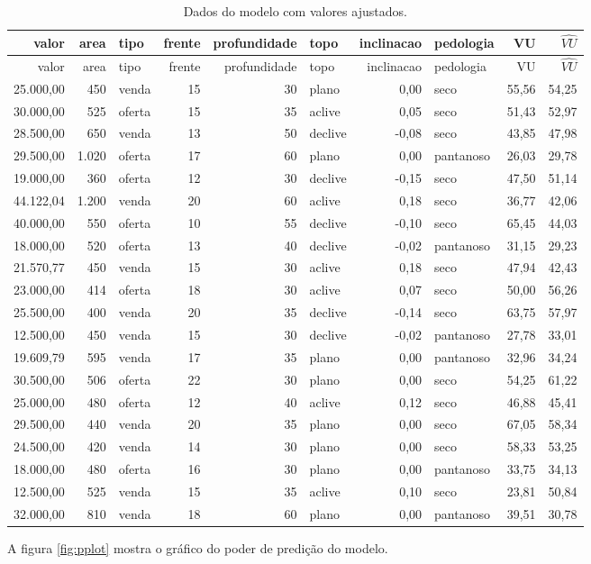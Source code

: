 \documentclass[a4paper, 12pt]{article}
\begin{document}
\begin{longtable}[]{@{}rrlrrlrlrr@{}}
\caption{Dados do modelo com valores ajustados.}\tabularnewline
\toprule
valor & area & tipo & frente & profundidade & topo & inclinacao &
pedologia & VU & \(\widehat{VU}\)\tabularnewline
\midrule
\endfirsthead
\toprule
valor & area & tipo & frente & profundidade & topo & inclinacao &
pedologia & VU & \(\widehat{VU}\)\tabularnewline
\midrule
\endhead
25.000,00 & 450 & venda & 15 & 30 & plano & 0,00 & seco & 55,56 &
54,25\tabularnewline
30.000,00 & 525 & oferta & 15 & 35 & aclive & 0,05 & seco & 51,43 &
52,97\tabularnewline
28.500,00 & 650 & venda & 13 & 50 & declive & -0,08 & seco & 43,85 &
47,98\tabularnewline
29.500,00 & 1.020 & oferta & 17 & 60 & plano & 0,00 & pantanoso & 26,03
& 29,78\tabularnewline
19.000,00 & 360 & oferta & 12 & 30 & declive & -0,15 & seco & 47,50 &
51,14\tabularnewline
44.122,04 & 1.200 & venda & 20 & 60 & aclive & 0,18 & seco & 36,77 &
42,06\tabularnewline
40.000,00 & 550 & oferta & 10 & 55 & declive & -0,10 & seco & 65,45 &
44,03\tabularnewline
18.000,00 & 520 & oferta & 13 & 40 & declive & -0,02 & pantanoso & 31,15
& 29,23\tabularnewline
21.570,77 & 450 & venda & 15 & 30 & aclive & 0,18 & seco & 47,94 &
42,43\tabularnewline
23.000,00 & 414 & oferta & 18 & 30 & aclive & 0,07 & seco & 50,00 &
56,26\tabularnewline
25.500,00 & 400 & venda & 20 & 35 & declive & -0,14 & seco & 63,75 &
57,97\tabularnewline
12.500,00 & 450 & venda & 15 & 30 & declive & -0,02 & pantanoso & 27,78
& 33,01\tabularnewline
19.609,79 & 595 & venda & 17 & 35 & plano & 0,00 & pantanoso & 32,96 &
34,24\tabularnewline
30.500,00 & 506 & oferta & 22 & 30 & plano & 0,00 & seco & 54,25 &
61,22\tabularnewline
25.000,00 & 480 & oferta & 12 & 40 & aclive & 0,12 & seco & 46,88 &
45,41\tabularnewline
29.500,00 & 440 & venda & 20 & 35 & plano & 0,00 & seco & 67,05 &
58,34\tabularnewline
24.500,00 & 420 & venda & 14 & 30 & plano & 0,00 & seco & 58,33 &
53,25\tabularnewline
18.000,00 & 480 & oferta & 16 & 30 & plano & 0,00 & pantanoso & 33,75 &
34,13\tabularnewline
12.500,00 & 525 & venda & 15 & 35 & aclive & 0,10 & seco & 23,81 &
50,84\tabularnewline
32.000,00 & 810 & venda & 18 & 60 & plano & 0,00 & pantanoso & 39,51 &
30,78\tabularnewline
\bottomrule
\end{longtable}

A figura \ref{fig:pplot} mostra o gráfico do poder de predição do
modelo.
\end{document}
